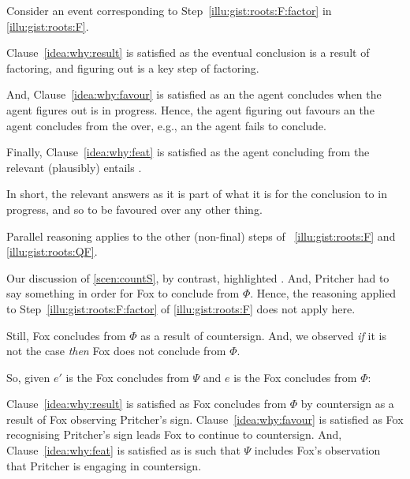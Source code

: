 \begin{note}
  Consider an event corresponding to Step~\ref{illu:gist:roots:F:factor} in \autoref{illu:gist:roots:F}.

  Clause~\ref{idea:why:result} is satisfied as the eventual conclusion is a result of factoring, and figuring out \rootsConEqFac{} is a key step of factoring.

  And, Clause~\ref{idea:why:favour} is satisfied as an  the agent concludes  when the agent figures out \rootsConEqFac{} is in progress.
  Hence, the agent figuring out \rootsConEqFac{} favours an  the agent concludes  from the \pool{} over, e.g., an  the agent fails to conclude.

  Finally, Clause~\ref{idea:why:feat} is satisfied as the agent concluding  from the relevant \pool{} (plausibly) entails .
\end{note}


\begin{note}
  In short, the relevant  answers \qWhy{} as it is part of what it is for the conclusion to in progress, and so to be favoured over any other thing.

  Parallel reasoning applies to the other (non-final) steps of ~\ref{illu:gist:roots:F} and \ref{illu:gist:roots:QF}.
\end{note}


\begin{note}
  Our discussion of \autoref{scen:countS}, by contrast, highlighted .
  And, Pritcher had to say something in order for Fox to conclude  from \(\Phi\).
  Hence, the reasoning applied to Step~\ref{illu:gist:roots:F:factor} of \autoref{illu:gist:roots:F} does not apply here.

  Still, Fox concludes  from \(\Phi\) as a result of countersign.
  And, we observed \emph{if} it is not the case  \emph{then} Fox does not conclude  from \(\Phi\).

  So, given \(e'\) is the  Fox concludes  from \(\Psi\) and \(e\) is the  Fox concludes  from \(\Phi\):

  Clause~\ref{idea:why:result} is satisfied as Fox concludes  from \(\Phi\) by countersign as a result of Fox observing Pritcher's sign.
  Clause~\ref{idea:why:favour} is satisfied as Fox recognising Pritcher's sign leads Fox to continue to countersign.
  And, Clause~\ref{idea:why:feat} is satisfied as  is such that \(\Psi\) includes Fox's observation that Pritcher is engaging in countersign.
\end{note}


